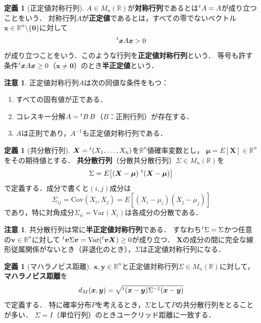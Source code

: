 \documentclass[dvipdfmx,a4paper,12pt]{jsarticle}
\theoremstyle{definition}
\newtheorem{definition}[theorem]{定義}
\newtheorem{remark}[theorem]{注意}
\begin{document}
\begin{definition}[正定値対称行列]
    $A\in M_n(\mathbb{R})$が\textbf{対称行列}であるとは$\prescript{t}{}{}A=A$が成り立つことをいう．
    対称行列$A$が\textbf{正定値}であるとは，すべての零でないベクトル$\bm{x}\in\mathbb{R}^n\setminus\{\bm{0}\}$に対して
    $$\prescript{t}{}{}\bm{x}A\bm{x}>0$$
    が成り立つことをいう．このような行列を\textbf{正定値対称行列}という．
    等号も許す条件$\prescript{t}{}{}\bm{x}A\bm{x}\geq 0$（$\bm{x}\neq\bm{0}$）のとき\textbf{半正定値}という．
\end{definition}

\begin{remark}
    正定値対称行列$A$は次の同値な条件をもつ：
    \begin{enumerate}
        \item すべての固有値が正である．
        \item コレスキー分解$A=\prescript{t}{}{}B\,B$（$B$：正則行列）が存在する．
        \item $A$は正則であり，$A^{-1}$も正定値対称行列である．
    \end{enumerate}
\end{remark}

\begin{definition}[共分散行列]
    $\bm{X}=\prescript{t}{}{}(X_1,\ldots,X_n)$を$\mathbb{R}^n$値確率変数とし，
    $\bm{\mu}=E[\bm{X}]\in\mathbb{R}^n$をその期待値とする．
    \textbf{共分散行列}（分散共分散行列）$\Sigma\in M_n(\mathbb{R})$を
    $$\Sigma=E\bigl[(\bm{X}-\bm{\mu})\,\prescript{t}{}{}(\bm{X}-\bm{\mu})\bigr]$$
    で定義する．成分で書くと$(i,j)$成分は
    $$\Sigma_{ij}=\mathrm{Cov}(X_i,X_j)=E[(X_i-\mu_i)(X_j-\mu_j)]$$
    であり，特に対角成分$\Sigma_{ii}=\mathrm{Var}(X_i)$は各成分の分散である．
\end{definition}

\begin{remark}
    共分散行列は常に\textbf{半正定値対称行列}である．
    すなわち$\prescript{t}{}{}\Sigma=\Sigma$かつ任意の$\bm{v}\in\mathbb{R}^n$に対して
    $\prescript{t}{}{}\bm{v}\Sigma\bm{v}=\mathrm{Var}(\prescript{t}{}{}\bm{v}\bm{X})\geq 0$が成り立つ．
    $\bm{X}$の成分の間に完全な線形従属関係がないとき（非退化のとき），$\Sigma$は正定値対称行列になる．
\end{remark}

\begin{definition}[マハラノビス距離]
    $\bm{x},\bm{y}\in\mathbb{R}^n$と正定値対称行列$\Sigma\in M_n(\mathbb{R})$に対して，
    \textbf{マハラノビス距離}を
    $$d_M(\bm{x},\bm{y})=\sqrt{\prescript{t}{}{}(\bm{x}-\bm{y})\Sigma^{-1}(\bm{x}-\bm{y})}$$
    で定義する．
    特に確率分布$P$を考えるとき，$\Sigma$として$P$の共分散行列をとることが多い．
    $\Sigma=I$（単位行列）のときユークリッド距離に一致する．
\end{definition}
\end{document}
